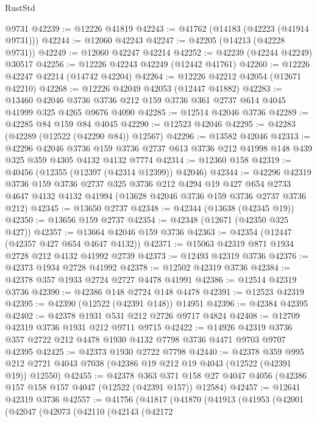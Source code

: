 \begin{lexlean}{RustStd}
\begin{coremodule}
    @9731
@42239 := @12226 @41819
@42243 := @41762 (@14183 (@42223 (@41914 @9731)))
@42244 := @12060 @42243
@42247 := @42205 (@14213 (@42228 @9731))
@42249 := @12060 @42247 @42214
@42252 := @42239 (@42244 @42249) @30517
@42256 := @12226 @42243 @42249 (@12442 @41761)
@42260 := @12226 @42247 @42214 (@14742 @42204)
@42264 := @12226 @42212 @42054 (@12671 @42210)
@42268 := @12226 @42049 @42053 (@12447 @41882)
@42283 := @13460
    @42046
    @3736
    @3736
    @212
    @159
    @3736
    @361
    @2737
    @614
    @4045
    @41999
    @325
    @4265
    @9676
    @4090
@42285 := @12514 @42046 @3736
@42289 := @42285 @84 @159 @84 @4045
@42290 := @12523 @42046
@42295 := @42283 (@42289 (@12522 (@42290 @84)) @12567)
@42296 := @13582 @42046
@42313 := @42296
    @42046
    @3736
    @159
    @3736
    @2737
    @613
    @3736
    @212
    @41998
    @148
    @439
    @325
    @359
    @4305
    @4132
    @4132
    @7774
@42314 := @12360 @158
@42319 := @40456 (@12355 (@12397 (@42314 @12399)) @42046)
@42344 := @42296
    @42319
    @3736
    @159
    @3736
    @2737
    @325
    @3736
    @212
    @4294
    @19
    @427
    @654
    @2733
    @4647
    @4132
    @4132
    @41994
    (@13628 @42046 @3736 @159 @3736 @2737 @3736 @212)
@42345 := @13650 @2737
@42348 := @42344 (@13638 (@42345 @19))
@42350 := @13656 @159 @2737
@42354 := @42348 (@12671 (@42350 @325 @427))
@42357 := @13664 @42046 @159 @3736
@42363 := @42354 (@12447 (@42357 @427 @654 @4647 @4132))
@42371 := @15063 @42319 @871 @1934 @2728 @212 @4132 @41992 @2739
@42373 := @12493 @42319 @3736
@42376 := @42373 @1934 @2728 @41992
@42378 := @12502 @42319 @3736
@42384 := @42378 @357 @1933 @2724 @2727 @4478 @41991
@42386 := @12514 @42319 @3736
@42390 := @42386 @148 @2724 @148 @4478
@42391 := @12523 @42319
@42395 := @42390 (@12522 (@42391 @148)) @14951
@42396 := @42384 @42395
@42402 := @42378 @1931 @531 @212 @2726 @9717 @4824
@42408 := @12709 @42319 @3736 @1931 @212 @9711 @9715
@42422 := @14926 @42319 @3736 @357 @2722 @212 @4478 @1930 @4132 @7798 @3736 @4471 @9703 @9707 @42395
@42425 := @42373 @1930 @2722 @7798
@42440 := @42378
    @359
    @995
    @212
    @2721
    @4043
    @7038
    (@42386 @19 @212 @19 @4043 (@12522 (@42391 @19)) @12550)
@42455 := @42378
    @363
    @371
    @158
    @27
    @4047
    @4056
    (@42386 @157 @158 @157 @4047 (@12522 (@42391 @157)) @12584)
@42457 := @12641 @42319 @3736
@42557 := @41756
    (@41817
      (@41870
        (@41913
          (@41953
            (@42001
              (@42047
                (@42073
                  (@42110
                    (@42143
                      (@42172

\end{coremodule}
\end{lexlean}
